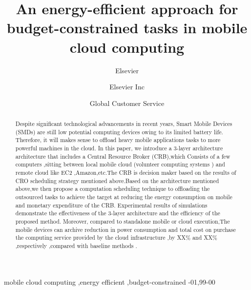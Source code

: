 \documentclass[review]{elsarticle}
\begin{document}
\begin{frontmatter}

\title{An energy-efficient approach for budget-constrained tasks in mobile cloud computing}

\author{Elsevier}
\address{Radarweg 29, Amsterdam}

\author[mymainaddress,mysecondaryaddress]{Elsevier Inc}

\author[mysecondaryaddress]{Global Customer Service}

\address[mymainaddress]{1600 John F Kennedy Boulevard, Philadelphia}
\address[mysecondaryaddress]{360 Park Avenue South, New York}

\begin{abstract}
    Despite significant technological advancements in recent years, Smart Mobile Devices (SMDs) are still low potential computing devices owing to its limited battery life. Therefore, it will makes sense to offload heavy mobile applications tasks to more powerful machines in the cloud.
    In this paper, we introduce a 3-layer architecture architecture that includes a Central Resource Broker (CRB),which Consists of a few computers ,sitting between local mobile cloud (volunteer computing systems ) and remote cloud like EC2 ,Amazon,etc.The CRB is decision maker based on the results of CRO scheduling strategy mentioned above.Based on the architecture mentioned above,we then propose a computation scheduling technique to offloading the outsourced tasks to achieve the target at reducing the energy consumption on mobile and monetary expenditure of the CRB.
    Experimental results of simulations demonstrate the effectiveness of the 3-layer architecture and the efficiency of the proposed method. Moreover, compared to standalone mobile or cloud execution,The mobile devices can archive reduction in power consumption and total cost on purchase the computing service provided by the cloud infrastructure ,by XX\% and XX\% ,respectively ,compared with baseline methods .
\end{abstract}

\begin{keyword}
    \texttt {}mobile cloud computing \sep  {energy efficient} \sep {budget-constrained}
    -01\sep  99-00
\end{keyword}

\end{frontmatter}
\end{document}

